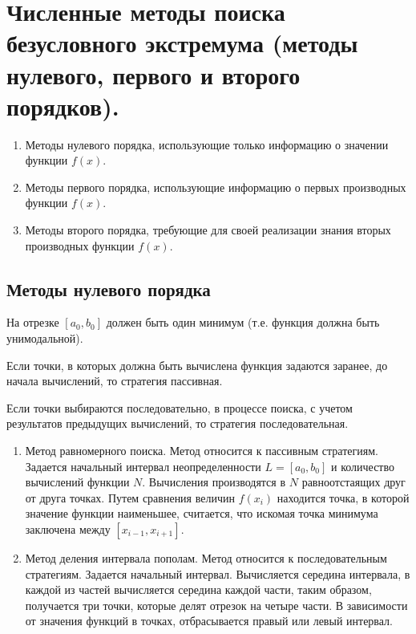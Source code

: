 \documentclass[12pt]{report}
\theoremstyle{definition}
\begin{document}

\section
{
  Численные методы поиска безусловного экстремума
  (методы нулевого, первого и второго порядков).
}

\begin{enumerate}
\item Методы нулевого порядка, использующие только информацию
о значении функции $f(x)$.
\item Методы первого порядка, использующие информацию о первых производных
функции $f(x)$.
\item Методы второго порядка, требующие для своей реализации знания вторых
производных функции $f(x)$.
\end{enumerate}

\subsection{Методы нулевого порядка}

На отрезке $[a_0, b_0]$ должен быть один минимум (т.е. функция должна быть
унимодальной).

Если точки, в которых должна быть вычислена функция задаются заранее, до
начала вычислений, то стратегия пассивная.


Если точки выбираются последовательно, в процессе поиска, с учетом результатов
предыдущих вычислений, то стратегия последовательная.

\begin{enumerate}
\item Метод равномерного поиска.
  Метод относится к пассивным стратегиям. Задается начальный
  интервал неопределенности $L = [a_0, b_0]$ и количество вычислений
  функции $N$. Вычисления производятся в $N$ равноотстаящих друг от друга
  точках. Путем сравнения величин $f(x_i)$ находится точка, в которой
  значение функции наименьшее, считается, что искомая точка минимума
  заключена между $[x_{i-1}, x_{i+1}]$.
\item Метод деления интервала пополам.
  Метод относится к последовательным стратегиям. Задается начальный интервал.
  Вычисляется середина интервала, в каждой из частей вычисляется середина каждой
  части, таким образом, получается три точки, которые делят отрезок на четыре части.
  В зависимости от значения функций в точках, отбрасывается правый или левый интервал.
\end{enumerate}
\end{document}
